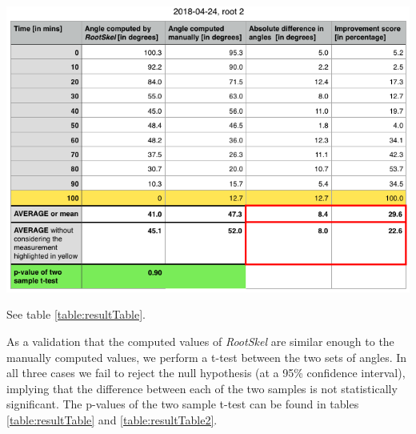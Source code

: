 \begin{table}[H]
	\includegraphics[width=\textwidth]{../Figures/2018-04-24-stats-new.png}
	\caption{See table \ref*{table:resultTable}.}
	\label{table:resultTable2}
\end{table}


As a validation that the computed values of \textit{RootSkel} are similar enough to the manually computed values, we perform a t-test between the two sets of angles.
In all three cases we fail to reject the null hypothesis (at a 95\% confidence interval), implying that the difference between each of the two samples is not statistically significant. The p-values of the two sample t-test can be found in tables \ref{table:resultTable} and \ref{table:resultTable2}.








%
%



